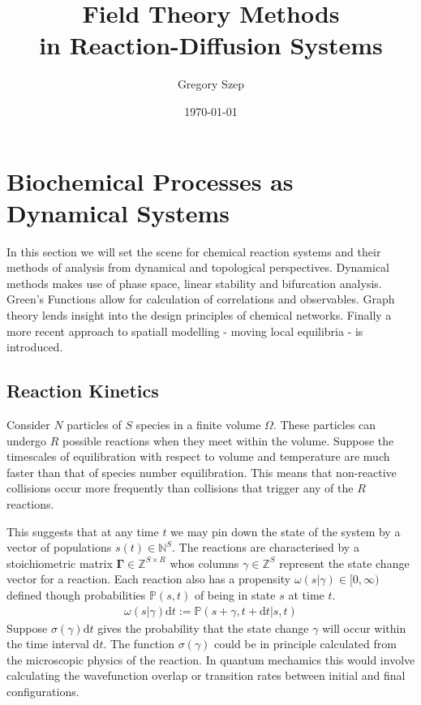 \documentclass{article}[12pt]
\numberwithin{equation}{section}
\begin{document}
\title{
Field Theory Methods \\
in Reaction-Diffusion Systems
}

\author{Gregory Szep}
\date{\today}
\maketitle
\vspace{-25pt}
\section{Biochemical Processes as Dynamical Systems} \vspace{-10pt}
In this section we will set the scene for chemical reaction systems and their
methods of analysis from dynamical and topological perspectives. Dynamical
methods makes use of phase space, linear stability and bifurcation analysis.
Green's Functions allow for calculation of correlations and observables.
Graph theory lends insight into the design principles of chemical networks.
Finally a more recent approach to spatiall modelling - moving local equilibria -
is introduced. \vspace{-30pt}
\subsection{Reaction Kinetics} \vspace{-10pt}
Consider $N$ particles of $S$ species in a finite volume $\Omega$. These particles
can undergo $R$ possible reactions when they meet within the volume. Suppose the
timescales of equilibration with respect to volume and temperature are much faster
than that of species number equilibration. This means that non-reactive collisions
occur more frequently than collisions that trigger any of the $R$ reactions.

This suggests that at any time $t$ we may pin down the state of the system by a
vector of populations $s(t)\in\mathbb{N}^S$. The reactions are characterised by
a stoichiometric matrix $\mathbf{\Gamma}\in\mathbb{Z}^{S\times R}$ whos columns
$\gamma\in\mathbb{Z}^{S}$ represent the state change vector for a reaction. Each
reaction also has a propensity $\omega(s|\gamma)\in[0,\infty)$ defined though
probabilities $\mathbb{P}(s,t)$ of being in state $s$ at time $t$.
\begin{align}
	\omega(s|\gamma)\mathrm{d}t := \mathbb{P}(s+\gamma,t+\mathrm{d}t|s,t)
	\label{eq:fundamentalpremise}
\end{align}
Suppose $\sigma(\gamma)\mathrm{d}t$ gives the probability that the state change
$\gamma$ will occur within the time interval $\mathrm{d}t$. The function $\sigma(\gamma)$
could be in principle calculated from the microscopic physics of the reaction.
In quantum mechamics this would involve calculating the wavefunction overlap
or transition rates between initial and final configurations.
\end{document}
